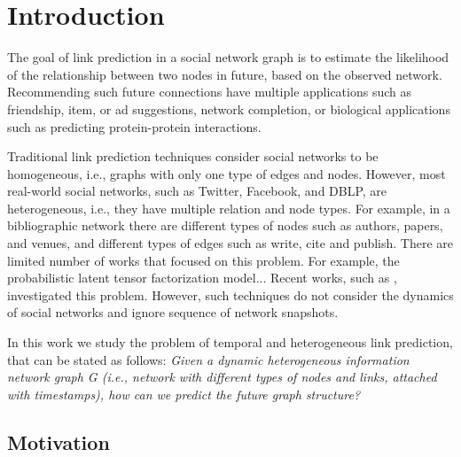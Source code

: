 \section{Introduction}
\label{Sec:Introduction}


The goal of link prediction in a social network graph \cite{liben2007link} is to estimate the likelihood of the relationship between two nodes in future, based on the observed network. Recommending such future connections have multiple applications such as friendship, item, or ad suggestions, network completion, or biological applications such as predicting protein-protein interactions.


Traditional link prediction techniques \cite{liben2007link} consider social networks to be homogeneous, i.e., graphs with only one type of edges and nodes. However, most real-world social networks, such as Twitter, Facebook, and DBLP, are heterogeneous, i.e., they have multiple relation and node types. For example, in a bibliographic network there are different types of nodes such as authors, papers, and venues, and different types of edges such as write, cite and publish. There are limited number of works that focused on this problem. For example, the probabilistic latent tensor factorization model... Recent works, such as \cite{sun2011pathsim}, investigated this problem. However, such techniques do not consider the dynamics of social networks and ignore sequence of network snapshots. 
\cite{Zhu2016} \cite{sun2011pathsim} \cite{Sun:2012:HRP:2124295.2124373}  \cite{huang2016meta} \cite{wang2016relsim} \cite{sun2013pathselclus} \cite{sun2011ASONAM} \cite{Yang2012} \cite{liben2007link}


In this work we study the problem of temporal and heterogeneous link prediction, that can be stated as follows: \textit{Given a dynamic heterogeneous information network graph G (i.e., network with different types of nodes and links, attached with timestamps), how can we predict the future graph structure?}



\subsection{Motivation}

